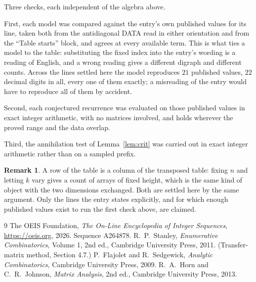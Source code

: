 \documentclass[11pt,a4paper]{article}
\theoremstyle{plain}
\theoremstyle{definition}
\newtheorem{remark}[theorem]{Remark}
\begin{document}
Three checks, each independent of the algebra above.

First, each model was compared against the entry's own published values for its line, taken
both from the antidiagonal DATA read in either orientation and from the ``Table starts''
block, and agrees at every available term. This is what ties a model to the table:
substituting the fixed index into the entry's wording is a reading of English, and a wrong
reading gives a different digraph and different counts. Across the lines settled here the
model reproduces $21$ published values, $22$ decimal digits in all, every one of
them exactly; a misreading of the entry would have to reproduce all of them by accident.

Second, each conjectured recurrence was evaluated on those published values in exact
integer arithmetic, with no matrices involved, and holds wherever the proved range and the
data overlap.

Third, the annihilation test of Lemma~\ref{lem:crit} was carried out in exact integer
arithmetic rather than on a sampled prefix.

\begin{remark}
A row of the table is a column of the transposed table: fixing $n$ and letting $k$ vary gives a
count of arrays of fixed height, which is the same kind of object with the two dimensions
exchanged. Both are settled here by the same argument. Only the lines the entry states
explicitly, and for which enough published values exist to run the first check above, are
claimed.
\end{remark}

\begin{thebibliography}{9}
 The OEIS Foundation, \emph{The On-Line Encyclopedia of Integer
Sequences}, \url{https://oeis.org}, 2026. Sequence A264878.
 R.~P.~Stanley, \emph{Enumerative Combinatorics}, Volume 1, 2nd ed.,
Cambridge University Press, 2011. (Transfer-matrix method, Section 4.7.)
 P.~Flajolet and R.~Sedgewick, \emph{Analytic Combinatorics}, Cambridge
University Press, 2009.
 R.~A.~Horn and C.~R.~Johnson, \emph{Matrix Analysis}, 2nd ed., Cambridge
University Press, 2013.
\end{thebibliography}
\end{document}
